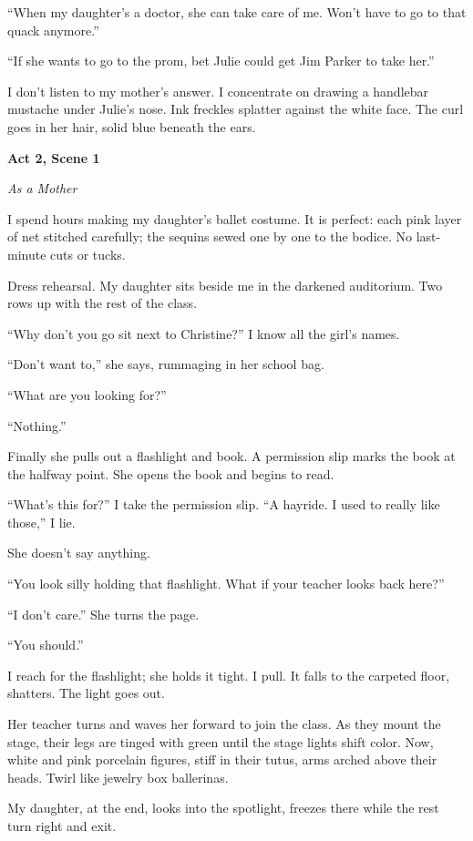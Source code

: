 \documentclass[twoside,10pt]{book}
\begin{document}
``When my daughter's a doctor, she can take care of me. Won't have to go
to that quack anymore.''

``If she wants to go to the prom, bet Julie could get Jim Parker to take
her.''

I don't listen to my mother's answer. I concentrate on drawing a
handlebar mustache under Julie's nose. Ink freckles splatter against the
white face. The curl goes in her hair, solid blue beneath the ears.

\textbf{Act 2, Scene 1}

\emph{As a Mother}

I spend hours making my daughter's ballet costume. It is perfect: each
pink layer of net stitched carefully; the sequins sewed one by one to
the bodice. No last-minute cuts or tucks.

Dress rehearsal. My daughter sits beside me in the darkened auditorium.
Two rows up with the rest of the class.

``Why don't you go sit next to Christine?'' I know all the girl's names.

``Don't want to,'' she says, rummaging in her school bag.

``What are you looking for?''

``Nothing.''

Finally she pulls out a flashlight and book. A permission slip marks the
book at the halfway point. She opens the book and begins to read.

``What's this for?'' I take the permission slip. ``A hayride. I used to
really like those,'' I lie.

She doesn't say anything.

``You look silly holding that flashlight. What if your teacher looks
back here?''

``I don't care.'' She turns the page.

``You should.''

I reach for the flashlight; she holds it tight. I pull. It falls to the
carpeted floor, shatters. The light goes out.

Her teacher turns and waves her forward to join the class. As they mount
the stage, their legs are tinged with green until the stage lights shift
color. Now, white and pink porcelain figures, stiff in their tutus, arms
arched above their heads. Twirl like jewelry box ballerinas.

My daughter, at the end, looks into the spotlight, freezes there while
the rest turn right and exit.
\end{document}
